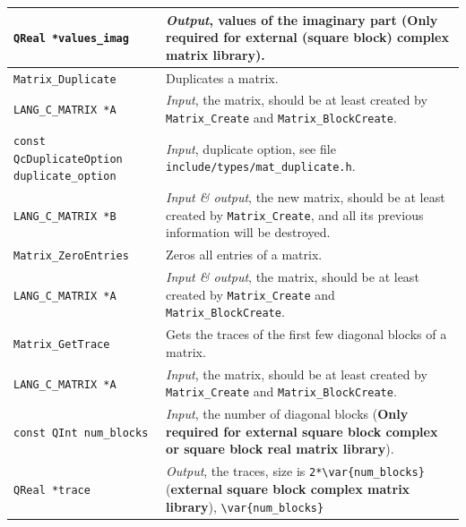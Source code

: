 \documentclass[a4paper,11pt,twoside,openright]{book}
\begin{document}
\begin{center}
\begin{longtable}{l|p{}}
    \hspace*{2ex}\verb|QReal *values_imag| %
      & \textsl{Output}, values of the imaginary part %
        (\textbf{Only required for external (square block) complex matrix library}).\\
    \hline
%
    \verb|Matrix_Duplicate|\index{\texttt{Matrix\_Duplicate}} %
      & Duplicates a matrix.\\
    \hspace*{2ex}\verb|LANG_C_MATRIX *A| %
      & \textsl{Input}, the matrix, should be at least created by \verb|Matrix_Create|
        and \verb|Matrix_BlockCreate|.\\
    \hspace*{2ex}\verb|const QcDuplicateOption duplicate_option| %
      & \textsl{Input}, duplicate option, see file
        \verb|include/types/mat_duplicate.h|.\\
    \hspace*{2ex}\verb|LANG_C_MATRIX *B| %
      & \textsl{Input \& output}, the new matrix, should be at least created by
        \verb|Matrix_Create|, and all its previous information will be destroyed.\\
    \hline
%
    \verb|Matrix_ZeroEntries|\index{\texttt{Matrix\_ZeroEntries}} %
      & Zeros all entries of a matrix.\\
    \hspace*{2ex}\verb|LANG_C_MATRIX *A| %
      & \textsl{Input \& output}, the matrix, should be at least created by
        \verb|Matrix_Create| and \verb|Matrix_BlockCreate|.\\
    \hline
%
    \verb|Matrix_GetTrace|\index{\texttt{Matrix\_GetTrace}} %
      & Gets the traces of the first few diagonal blocks of a matrix.\\
    \hspace*{2ex}\verb|LANG_C_MATRIX *A| %
      & \textsl{Input}, the matrix, should be at least created by
        \verb|Matrix_Create| and \verb|Matrix_BlockCreate|.\\
    \hspace*{2ex}\verb|const QInt num_blocks| %
      & \textsl{Input}, the number of diagonal blocks %
        (\textbf{Only required for external square block complex or
        square block real matrix library}).\\
    \hspace*{2ex}\verb|QReal *trace| %
      & \textsl{Output}, the traces, size is \verb|2*\var{num_blocks}| %
        (\textbf{external square block complex matrix library}), \verb|\var{num_blocks}| %

\end{longtable}
\end{center}
\end{document}
